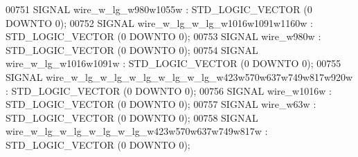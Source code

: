 \begin{DoxyCode}
{00751      \textcolor{keywordflow}{SIGNAL}  \textcolor{vhdlchar}{wire_w_lg_w980w1055w}   \textcolor{vhdlchar}{:}   \textcolor{comment}{STD\_LOGIC\_VECTOR} \textcolor{vhdlchar}{(}\textcolor{vhdllogic}{}\textcolor{vhdllogic}{0} \textcolor{keywordflow}{DOWNTO} \textcolor{vhdllogic}{}\textcolor{vhdllogic}{0}\textcolor{vhdlchar}{)};
00752      \textcolor{keywordflow}{SIGNAL}  \textcolor{vhdlchar}{wire_w_lg_w_lg_w1016w1091w1160w}    \textcolor{vhdlchar}{:}   \textcolor{comment}{STD\_LOGIC\_VECTOR} \textcolor{vhdlchar}{(}\textcolor{vhdllogic}{}\textcolor{vhdllogic}{0} \textcolor{keywordflow}{DOWNTO} \textcolor{vhdllogic}{}\textcolor{vhdllogic}{0}\textcolor{vhdlchar}{)};
00753      \textcolor{keywordflow}{SIGNAL}  \textcolor{vhdlchar}{wire_w980w} \textcolor{vhdlchar}{:}   \textcolor{comment}{STD\_LOGIC\_VECTOR} \textcolor{vhdlchar}{(}\textcolor{vhdllogic}{}\textcolor{vhdllogic}{0} \textcolor{keywordflow}{DOWNTO} \textcolor{vhdllogic}{}\textcolor{vhdllogic}{0}\textcolor{vhdlchar}{)};
00754      \textcolor{keywordflow}{SIGNAL}  \textcolor{vhdlchar}{wire_w_lg_w1016w1091w}  \textcolor{vhdlchar}{:}   \textcolor{comment}{STD\_LOGIC\_VECTOR} \textcolor{vhdlchar}{(}\textcolor{vhdllogic}{}\textcolor{vhdllogic}{0} \textcolor{keywordflow}{DOWNTO} \textcolor{vhdllogic}{}\textcolor{vhdllogic}{0}\textcolor{vhdlchar}{)};
00755      \textcolor{keywordflow}{SIGNAL}  \textcolor{vhdlchar}{wire_w_lg_w_lg_w_lg_w_lg_w_lg_w423w570w637w749w817w920w}    \textcolor{vhdlchar}{:}   \textcolor{comment}{STD\_LOGIC\_VECTOR} \textcolor{vhdlchar}{(}\textcolor{vhdllogic}{}\textcolor{vhdllogic}{0} \textcolor{keywordflow}{DOWNTO} \textcolor{vhdllogic}{}\textcolor{vhdllogic}{0}\textcolor{vhdlchar}{)};
00756      \textcolor{keywordflow}{SIGNAL}  \textcolor{vhdlchar}{wire_w1016w}    \textcolor{vhdlchar}{:}   \textcolor{comment}{STD\_LOGIC\_VECTOR} \textcolor{vhdlchar}{(}\textcolor{vhdllogic}{}\textcolor{vhdllogic}{0} \textcolor{keywordflow}{DOWNTO} \textcolor{vhdllogic}{}\textcolor{vhdllogic}{0}\textcolor{vhdlchar}{)};
00757      \textcolor{keywordflow}{SIGNAL}  \textcolor{vhdlchar}{wire_w63w}  \textcolor{vhdlchar}{:}   \textcolor{comment}{STD\_LOGIC\_VECTOR} \textcolor{vhdlchar}{(}\textcolor{vhdllogic}{}\textcolor{vhdllogic}{0} \textcolor{keywordflow}{DOWNTO} \textcolor{vhdllogic}{}\textcolor{vhdllogic}{0}\textcolor{vhdlchar}{)};
00758      \textcolor{keywordflow}{SIGNAL}  \textcolor{vhdlchar}{wire_w_lg_w_lg_w_lg_w_lg_w423w570w637w749w817w} \textcolor{vhdlchar}{:}   \textcolor{comment}{STD\_LOGIC\_VECTOR} \textcolor{vhdlchar}{(}\textcolor{vhdllogic}{}\textcolor{vhdllogic}{0} \textcolor{keywordflow}{DOWNTO} \textcolor{vhdllogic}{}\textcolor{vhdllogic}{0}\textcolor{vhdlchar}{)};
}
\end{DoxyCode}
